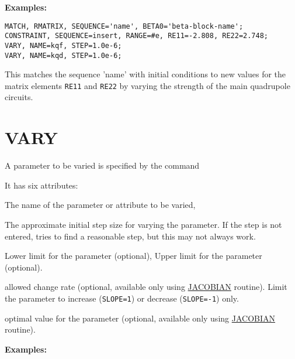 \textbf{Examples:}

\begin{verbatim}
MATCH, RMATRIX, SEQUENCE='name', BETA0='beta-block-name';
CONSTRAINT, SEQUENCE=insert, RANGE=#e, RE11=-2.808, RE22=2.748;
VARY, NAME=kqf, STEP=1.0e-6;
VARY, NAME=kqd, STEP=1.0e-6;
\end{verbatim}

This matches the sequence 'name' with initial conditions to new values
for the matrix elements \texttt{RE11} and \texttt{RE22} by varying the
strength of the main quadrupole circuits.




%
 
\section{VARY}
\label{sec:vary}
A parameter to be varied is specified by the command 


It has six attributes: 
\begin{madlist}
   The name of the parameter or attribute to be varied,  

   The approximate initial step size for varying the
  parameter. If the step is not entered, \madx tries to find a
  reasonable step, but this may not always work.  

   Lower limit for the parameter (optional), 
   Upper limit for the parameter (optional). 

   allowed change rate (optional, available only using
  \hyperref[subsec:match-jacobian]{JACOBIAN} routine). Limit the
  parameter to increase (\texttt{SLOPE=1}) or decrease (\texttt{SLOPE=-1}) only.

   optimal value for the parameter (optional, available
  only using \hyperref[subsec:match-jacobian]{JACOBIAN} routine).  
\end{madlist}

\textbf{Examples:}

